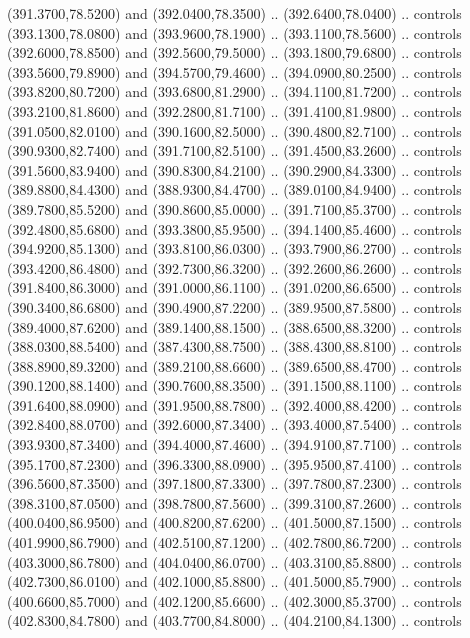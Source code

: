 {\begin{scope}[y=0.80pt, x=0.80pt, yscale=-1, xscale=1, inner sep=0pt, outer sep=0pt, #1]
      (391.3700,78.5200) and (392.0400,78.3500) .. (392.6400,78.0400) .. controls
      (393.1300,78.0800) and (393.9600,78.1900) .. (393.1100,78.5600) .. controls
      (392.6000,78.8500) and (392.5600,79.5000) .. (393.1800,79.6800) .. controls
      (393.5600,79.8900) and (394.5700,79.4600) .. (394.0900,80.2500) .. controls
      (393.8200,80.7200) and (393.6800,81.2900) .. (394.1100,81.7200) .. controls
      (393.2100,81.8600) and (392.2800,81.7100) .. (391.4100,81.9800) .. controls
      (391.0500,82.0100) and (390.1600,82.5000) .. (390.4800,82.7100) .. controls
      (390.9300,82.7400) and (391.7100,82.5100) .. (391.4500,83.2600) .. controls
      (391.5600,83.9400) and (390.8300,84.2100) .. (390.2900,84.3300) .. controls
      (389.8800,84.4300) and (388.9300,84.4700) .. (389.0100,84.9400) .. controls
      (389.7800,85.5200) and (390.8600,85.0000) .. (391.7100,85.3700) .. controls
      (392.4800,85.6800) and (393.3800,85.9500) .. (394.1400,85.4600) .. controls
      (394.9200,85.1300) and (393.8100,86.0300) .. (393.7900,86.2700) .. controls
      (393.4200,86.4800) and (392.7300,86.3200) .. (392.2600,86.2600) .. controls
      (391.8400,86.3000) and (391.0000,86.1100) .. (391.0200,86.6500) .. controls
      (390.3400,86.6800) and (390.4900,87.2200) .. (389.9500,87.5800) .. controls
      (389.4000,87.6200) and (389.1400,88.1500) .. (388.6500,88.3200) .. controls
      (388.0300,88.5400) and (387.4300,88.7500) .. (388.4300,88.8100) .. controls
      (388.8900,89.3200) and (389.2100,88.6600) .. (389.6500,88.4700) .. controls
      (390.1200,88.1400) and (390.7600,88.3500) .. (391.1500,88.1100) .. controls
      (391.6400,88.0900) and (391.9500,88.7800) .. (392.4000,88.4200) .. controls
      (392.8400,88.0700) and (392.6000,87.3400) .. (393.4000,87.5400) .. controls
      (393.9300,87.3400) and (394.4000,87.4600) .. (394.9100,87.7100) .. controls
      (395.1700,87.2300) and (396.3300,88.0900) .. (395.9500,87.4100) .. controls
      (396.5600,87.3500) and (397.1800,87.3300) .. (397.7800,87.2300) .. controls
      (398.3100,87.0500) and (398.7800,87.5600) .. (399.3100,87.2600) .. controls
      (400.0400,86.9500) and (400.8200,87.6200) .. (401.5000,87.1500) .. controls
      (401.9900,86.7900) and (402.5100,87.1200) .. (402.7800,86.7200) .. controls
      (403.3000,86.7800) and (404.0400,86.0700) .. (403.3100,85.8800) .. controls
      (402.7300,86.0100) and (402.1000,85.8800) .. (401.5000,85.7900) .. controls
      (400.6600,85.7000) and (402.1200,85.6600) .. (402.3000,85.3700) .. controls
      (402.8300,84.7800) and (403.7700,84.8000) .. (404.2100,84.1300) .. controls

\end{scope}}
